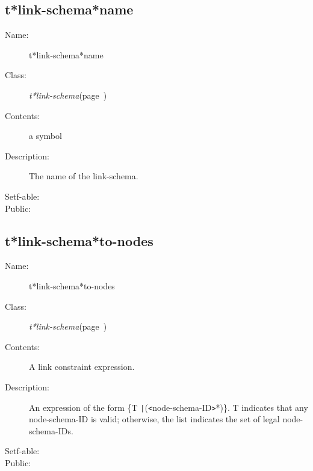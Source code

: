 \subsection{t*link-schema*name}
\label{t*link-schema*name}

\begin{description}
\item [Name:]  t*link-schema*name

\item [Class:] {\sl t*link-schema}\hfill(page~\pageref{t*link-schema})

\item [Contents:] a symbol

\item [Description:]

The name of the link-schema.

\item [Setf-able:]


\item [Public:]



\end{description}
\horizontalline

\subsection{t*link-schema*to-nodes}
\label{t*link-schema*to-nodes}

\begin{description}
\item [Name:]  t*link-schema*to-nodes

\item [Class:] {\sl t*link-schema}\hfill(page~\pageref{t*link-schema})

\item [Contents:] A link constraint expression.

\item [Description:]

An expression of the form \{T {\tt|}({\tt<}node-schema-ID{\tt>}*)\}.
T indicates that any node-schema-ID is valid; otherwise,
the list indicates the set of legal node-schema-IDs.

\item [Setf-able:]


\item [Public:]



\end{description}
\horizontalline

